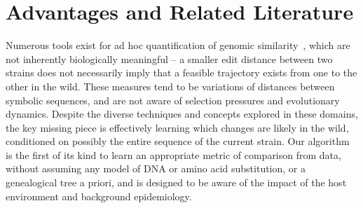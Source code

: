 \documentclass[onecolumn, compsoc,10pt]{IEEEtran}
\begin{document}
\section*{\enet Advantages and Related Literature}

Numerous tools exist for ad hoc quantification of genomic similarity~\cite{posada1998modeltest,goldberger2005genomic,huelsenbeck1997phylogeny,neher2014predicting,VanderMeer2010,Smith2009}, which are not inherently biologically meaningful -- a smaller edit distance between two strains does not necessarily imply that a feasible trajectory exists from one to the other in the wild. These measures tend to be  variations of distances between symbolic sequences, and are not aware of selection pressures and evolutionary dynamics. Despite the diverse techniques and concepts explored in these domains, the key missing piece is effectively learning which changes are likely in the wild, conditioned on possibly the entire sequence of the current strain. Our algorithm is the first of its kind to learn an appropriate metric of comparison from data, without assuming any model of DNA or amino acid substitution, or a genealogical tree a priori, and is  designed to be aware of the impact of the  host environment and background epidemiology.
\end{document}
